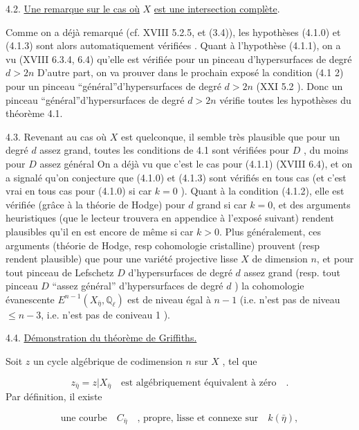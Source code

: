 4.2. \underline{Une remarque sur le cas où} $X$ \underline{est une intersection complète}.

Comme on a déjà remarqué (cf. XVIII 5.2.5, et (3.4)),  les hypothèses (4.1.0) et (4.1.3) sont alors automatiquement vérifiées . Quant à l'hypothèse (4.1.1), on a vu (XVIII 6.3.4, 6.4) qu'elle est vérifiée pour un pinceau d'hypersurfaces de degré $d > 2n$  D'autre part, on va prouver dans le prochain exposé la condition (4.1 2) pour un pinceau ``général''d'hypersurfaces de degré $d > 2n$  (XXI 5.2 ). Donc un pinceau ``général''d'hypersurfaces de degré $d > 2n$  vérifie toutes les hypothèses du théorème 4.1.



4.3.   Revenant au cas où $X$ est quelconque, il semble très plausible que pour un degré $d$ assez grand, toutes les conditions de 4.1 sont vérifiées pour $D$ , du moins pour $D$ assez général  On a déjà vu que c'est le cas pour (4.1.1) (XVIII 6.4), et on a signalé qu'on conjecture que (4.1.0) et (4.1.3) sont vérifiés en tous cas (et c'est vrai en tous cas pour (4.1.0) si  car $k = 0$ ). Quant à la condition (4.1.2), elle est vérifiée (grâce à la théorie de Hodge) pour $d$ grand si  car $k = 0$, et des arguments heuristiques (que le lecteur trouvera en appendice à l'exposé suivant) rendent plausibles qu'il en est encore de même si car $k > 0$.    Plus généralement, ces arguments (théorie de Hodge, resp cohomologie cristalline) prouvent (resp  rendent plausible) que pour une variété projective lisse $X$ de dimension $n$, et pour tout pinceau de Lefschetz $D$ d'hypersurfaces de degré $d$ assez grand (resp. tout pinceau $D$ ``assez général''  d'hypersurfaces de degré $d$ ) la cohomologie évanescente $E^{n-1}(X_{\bar{\eta}}, \mathbb{Q}_{\ell})$ est de niveau égal à $n-1$  (i.e. n'est pas de niveau  $\leqslant n-3$, i.e. n'est pas de coniveau 1 ).


4.4.  \underline{Démonstration du théorème de Griffiths.}

Soit $z$ un cycle algébrique de codimension $n$ sur $X$ , tel que

\begin{equation}\tag{4.4.1}
z_{\bar{\eta}} = z|X_{\bar{\eta}} \quad \text{est algébriquement équivalent à zéro} \quad .
\end{equation}
Par définition, il existe

\begin{equation}\tag{4.4.2}
\text{une courbe} \quad C_{\bar{\eta}} \quad \text{, propre, lisse et connexe sur} \quad k(\bar{\eta}) , 
\end{equation}

